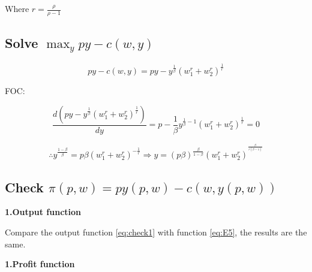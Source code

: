 \documentclass{article}
\begin{document}
Where $r = \frac{\rho}{\rho -1}$

\subsection{Solve $\max_y py - c(w, y)$ }

$$py - c(w, y) = py - y^{\frac{1}{\beta}}{(w_1^r + w_2^r)^{\frac{1}{r}}} $$

FOC:

$$\frac{d(py - y^{\frac{1}{\beta}}{(w_1^r + w_2^r)^{\frac{1}{r}}})}{dy}= p - \frac{1}{\beta}y^{\frac{1}{\beta} - 1} (w_1^r + w_2^r)^{\frac{1}{r}} = 0$$

\begin{equation}
\therefore y^{\frac{1- \beta}{\beta}} = p \beta (w_1^r + w_2^r)^{-\frac{1}{r}}  \Rightarrow y =  (p \beta)^{\frac{\beta}{1- \beta}} (w_1^r + w_2^r)^{^{\frac{\beta}{r(\beta - 1)}}}
    \label{eq:check1}   
\end{equation}

\subsection{Check $\pi (p,w) = py(p,w) - c(w, y(p,w))$}

\textbf{1.Output function}

Compare the output function \ref{eq:check1} with function \ref{eq:E5}, the results are the same.

\textbf{1.Profit function}
\end{document}
